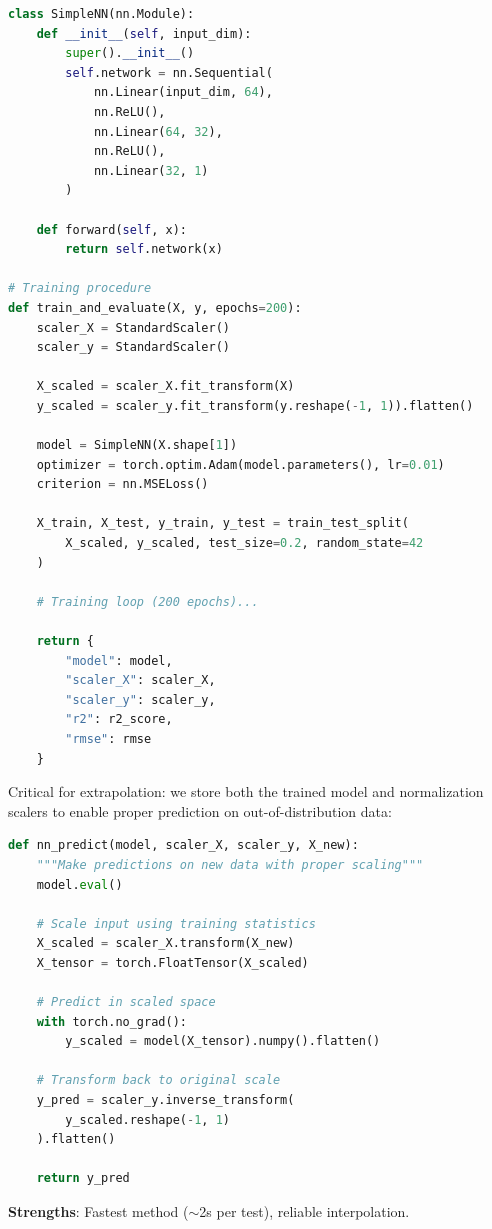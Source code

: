\begin{lstlisting}[language=Python, caption=Neural Network Architecture]
class SimpleNN(nn.Module):
    def __init__(self, input_dim):
        super().__init__()
        self.network = nn.Sequential(
            nn.Linear(input_dim, 64),
            nn.ReLU(),
            nn.Linear(64, 32),
            nn.ReLU(),
            nn.Linear(32, 1)
        )

    def forward(self, x):
        return self.network(x)

# Training procedure
def train_and_evaluate(X, y, epochs=200):
    scaler_X = StandardScaler()
    scaler_y = StandardScaler()

    X_scaled = scaler_X.fit_transform(X)
    y_scaled = scaler_y.fit_transform(y.reshape(-1, 1)).flatten()

    model = SimpleNN(X.shape[1])
    optimizer = torch.optim.Adam(model.parameters(), lr=0.01)
    criterion = nn.MSELoss()

    X_train, X_test, y_train, y_test = train_test_split(
        X_scaled, y_scaled, test_size=0.2, random_state=42
    )

    # Training loop (200 epochs)...

    return {
        "model": model,
        "scaler_X": scaler_X,
        "scaler_y": scaler_y,
        "r2": r2_score,
        "rmse": rmse
    }
\end{lstlisting}

Critical for extrapolation: we store both the trained model and normalization scalers to enable proper prediction on out-of-distribution data:

\begin{lstlisting}[language=Python, caption=Neural Network Prediction with Proper Scaling]
def nn_predict(model, scaler_X, scaler_y, X_new):
    """Make predictions on new data with proper scaling"""
    model.eval()

    # Scale input using training statistics
    X_scaled = scaler_X.transform(X_new)
    X_tensor = torch.FloatTensor(X_scaled)

    # Predict in scaled space
    with torch.no_grad():
        y_scaled = model(X_tensor).numpy().flatten()

    # Transform back to original scale
    y_pred = scaler_y.inverse_transform(
        y_scaled.reshape(-1, 1)
    ).flatten()

    return y_pred
\end{lstlisting}

\textbf{Strengths}: Fastest method ($\sim$2s per test), reliable interpolation.

